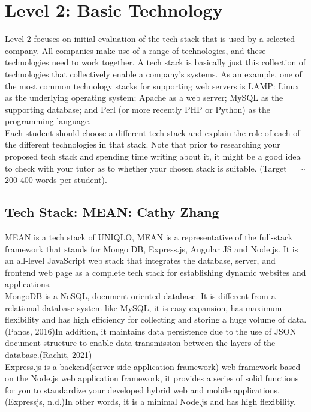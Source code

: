 \documentclass[a4paper, 11pt]{report}
\begin{document}
\newpage
\section{Level 2: Basic Technology}

Level 2 focuses on initial evaluation of the tech stack that is used by a selected company. All companies make use of a range of technologies, and these technologies need to work together. A tech stack is basically just this collection of technologies that collectively enable a company's systems. As an example, one of the most common technology stacks for supporting web servers is LAMP: Linux as the underlying operating system; Apache as a web server; MySQL as the supporting database; and Perl (or more recently PHP or Python) as the programming language.\\

Each student should choose a different tech stack and explain the role of each of the different technologies in that stack. Note that prior to researching your proposed tech stack and spending time writing about it, it might be a good idea to check with your tutor as to whether your chosen stack is suitable. (Target = $\sim$200-400 words per student).

\subsection{Tech Stack: MEAN: Cathy Zhang}

\noindent MEAN is a tech stack of UNIQLO, MEAN is a representative of the full-stack framework that stands for Mongo DB, Express.js, Angular JS and Node.js. It is an all-level JavaScript web stack that integrates the database, server, and frontend web page as a complete tech stack for establishing dynamic websites and applications. \\

\noindent MongoDB is a NoSQL, document-oriented database. It is different from a relational database system like MySQL, it is easy expansion, has maximum flexibility and has high efficiency for collecting and storing a huge volume of data. (Panos, 2016)In addition, it maintains data persistence due to the use of JSON document structure to enable data transmission between the layers of the database.(Rachit, 2021)\\

\noindent Express.js is a backend(server-side application framework) web framework based on the Node.js web application framework, it provides a series of solid functions for you to standardize your developed hybrid web and mobile applications. (Expressjs, n.d.)In other words, it is a minimal Node.js and has high flexibility.\\
\end{document}
